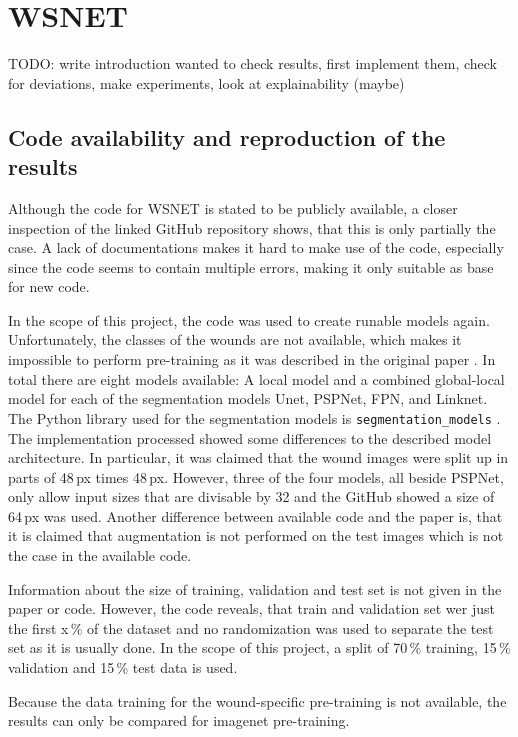 \section{WSNET}

TODO: write introduction
wanted to check results, first implement them, check for deviations, make experiments, look at explainability (maybe)

\subsection{Code availability and reproduction of the results}

Although the code for WSNET \cite{Oota_2023_WACV} is stated to be publicly available, a closer inspection of the linked GitHub repository shows, that this is only partially the case. A lack of documentations makes it hard to make use of the code, especially since the code seems to contain multiple errors, making it only suitable as base for new code.

In the scope of this project, the code was used to create runable models again. Unfortunately, the classes of the wounds are not available, which makes it impossible to perform pre-training as it was described in the original paper \cite{Oota_2023_WACV}. In total there are eight models available: A local model and a combined global-local model for each of the segmentation models Unet, PSPNet, FPN, and Linknet. The Python library used for the segmentation models is \texttt{segmentation\_models} \cite{SegmentationModels}. The implementation processed showed some differences to the described model architecture. In particular, it was claimed that the wound images were split up in parts of 48\,px times 48\,px. However, three of the four models, all beside PSPNet, only allow input sizes that are divisable by 32 and the GitHub showed a size of 64\,px was used. Another difference between available code and the paper is, that it is claimed that augmentation is not performed on the test images which is not the case in the available code.

Information about the size of training, validation and test set is not given in the paper or code. However, the code reveals, that train and validation set wer just the first x\,\% of the dataset and no randomization was used to separate the test set as it is usually done. In the scope of this project, a split of 70\,\% training, 15\,\% validation and 15\,\% test data is used.

Because the data training for the wound-specific pre-training is not available, the results can only be compared for imagenet pre-training.


